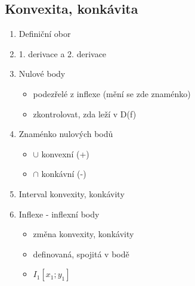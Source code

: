 \subsection{Konvexita, konkávita}
\begin{enumerate}
  \item Definiční obor
  \item 1. derivace a 2. derivace
  \item Nulové body
    \begin{itemize}
      \item podezřelé z inflexe (mění se zde znaménko)
      \item zkontrolovat, zda leží v D(f)
    \end{itemize}
  \item Znaménko nulových bodů
    \begin{itemize}
      \item $\cup$ konvexní (+)
      \item $\cap$ konkávní (-)
    \end{itemize}
  \item Interval konvexity, konkávity
  \item Inflexe - inflexní body
    \begin{itemize}
      \item změna konvexity, konkávity
      \item definovaná, spojitá v bodě
      \item $I_1[x_1;y_1]$
    \end{itemize}

\end{enumerate}

